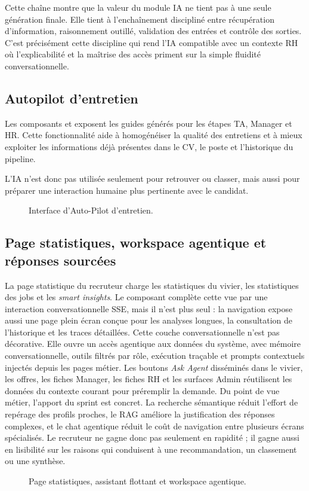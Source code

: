 Cette chaîne montre que la valeur du module IA ne tient pas à une seule génération finale. Elle tient à l'enchaînement discipliné entre récupération d'information, raisonnement outillé, validation des entrées et contrôle des sorties. C'est précisément cette discipline qui rend l'IA compatible avec un contexte RH où l'explicabilité et la maîtrise des accès priment sur la simple fluidité conversationnelle.


\subsection{Autopilot d'entretien}
Les composants  et  exposent les guides générés pour les étapes TA, Manager et HR. Cette fonctionnalité aide à homogénéiser la qualité des entretiens et à mieux exploiter les informations déjà présentes dans le CV, le poste et l'historique du pipeline.

L'IA n'est donc pas utilisée seulement pour retrouver ou classer, mais aussi pour préparer une interaction humaine plus pertinente avec le candidat.

\begin{figure}[H]
  \centering
  \caption{Interface d'Auto-Pilot d'entretien.}
\end{figure}

\subsection{Page statistiques, workspace agentique et réponses sourcées}
La page statistique du recruteur charge les statistiques du vivier, les statistiques des jobs et les \textit{smart insights}. Le composant  complète cette vue par une interaction conversationnelle SSE, mais il n'est plus seul : la navigation expose aussi une page  plein écran conçue pour les analyses longues, la consultation de l'historique et les traces détaillées.
Cette couche conversationnelle n'est pas décorative. Elle ouvre un accès agentique aux données du système, avec mémoire conversationnelle, outils filtrés par rôle, exécution traçable et prompts contextuels injectés depuis les pages métier. Les boutons \textit{Ask Agent} disséminés dans le vivier, les offres, les fiches Manager, les fiches RH et les surfaces Admin réutilisent les données du contexte courant pour préremplir la demande.
Du point de vue métier, l'apport du sprint est concret. La recherche sémantique réduit l'effort de repérage des profils proches, le RAG améliore la justification des réponses complexes, et le chat agentique réduit le coût de navigation entre plusieurs écrans spécialisés. Le recruteur ne gagne donc pas seulement en rapidité ; il gagne aussi en lisibilité sur les raisons qui conduisent à une recommandation, un classement ou une synthèse.
\begin{figure}[H]
  \centering
  \caption{Page statistiques, assistant flottant et workspace agentique.}
\end{figure}
